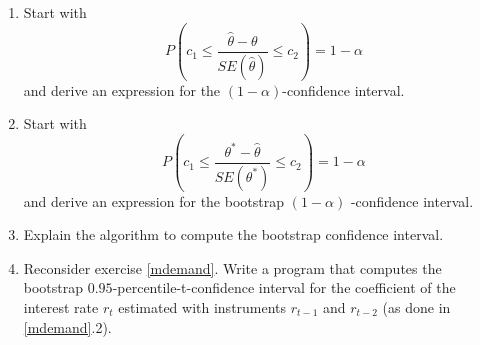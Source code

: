 \documentclass{article}
\begin{document}
\begin{enumerate}
\item Start with%
\begin{equation*}
P\left( c_{1}\leq \frac{\hat{\theta}-\theta }{SE(\hat{\theta})}\leq
c_{2}\right) =1-\alpha
\end{equation*}%
and derive an expression for the $\left( 1-\alpha \right) $-confidence
interval.

\item Start with%
\begin{equation*}
P\left( c_{1}\leq \frac{\theta ^{\ast }-\hat{\theta}}{SE(\theta ^{\ast })}%
\leq c_{2}\right) =1-\alpha
\end{equation*}%
and derive an expression for the bootstrap $\left( 1-\alpha \right) $%
-confidence interval.

\item Explain the algorithm to compute the bootstrap confidence interval.

\item Reconsider exercise \ref{mdemand}. Write a program that computes the
bootstrap $0.95$-percentile-t-confidence interval for the coefficient of the
interest rate $r_{t}$ estimated with instruments $r_{t-1}$ and $r_{t-2}$ (as
done in \ref{mdemand}.2).
\end{enumerate}
\end{document}

